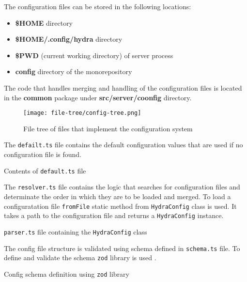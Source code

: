 \documentclass[../main.tex]{subfiles}
\begin{document}
The configuration files can be stored in the following locations:
\begin{itemize}
  \item \textbf{\$HOME} directory
  \item \textbf{\$HOME/.config/hydra} directory
  \item \textbf{\$PWD} (current working directory) of server process
  \item \textbf{config} directory of the monorepository
\end{itemize}

The code that handles merging and handling of the configuration files is located in the \textbf{common} package under \textbf{src/server/coonfig} directory.

\begin{figure}[H]
  \centering
  \texttt{[image: file-tree/config-tree.png]}
  \caption{File tree of files that implement the configuration system}
\end{figure}

The \texttt{defailt.ts} file contains the default configuration values that are used if no configuration file is found.

\begin{listing}[H]
  \caption{Contents of \texttt{default.ts} file}
\end{listing}

The \texttt{resolver.ts} file contains the logic that searches for configuration files and determinate the order in which they are to be loaded and merged.
To load a configuratation file \texttt{fromFile} static method from \texttt{HydraConfig} class is used. It takes a path to the configuration file and returns a \texttt{HydraConfig} instance.

\begin{listing}[H]
  \caption{\texttt{parser.ts} file containing the \texttt{HydraConfig} class}
\end{listing}

The config file structure is validated using schema defined in \texttt{schema.ts} file.
To define and validate the schema \texttt{zod} library is used \cite{zod}.

\begin{listing}[H]
  \caption{Config schema definition using \texttt{zod} library}
\end{listing}
\end{document}
